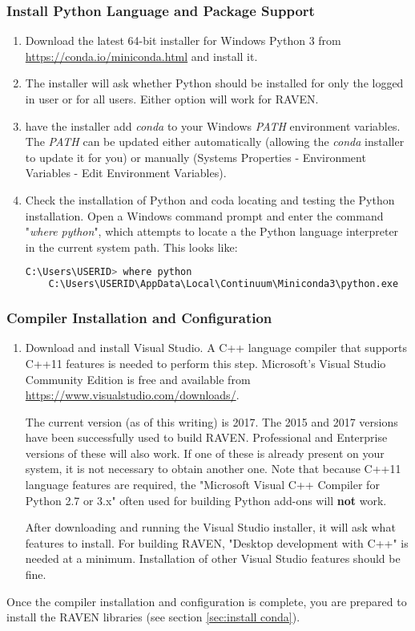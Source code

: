 \subsubsection{Install Python Language and Package Support}
\begin{enumerate} 
	\item Download the latest 64-bit installer for Windows Python 3 from
		\url{https://conda.io/miniconda.html} and install it.  \item The installer
		will ask whether Python should be installed for only the logged in user or
		for all users.  Either option will work for RAVEN.
	\item 	have  the installer add \textit{conda} to your Windows \textit{PATH} environment variables.   
	The \textit{PATH} can be updated either automatically (allowing the  \textit{conda} installer to update it for you) 
	or manually (Systems Properties - Environment Variables - Edit Environment Variables).
	\item Check the installation of Python and coda locating and testing the Python installation.   
	Open a Windows command prompt and enter the
		command "{\it where python}", which attempts to locate a the Python language interpreter
		in the current system path.  This looks like:

    \begin{lstlisting}[language=bash, basicstyle=\small]
    C:\Users\USERID> where python
    C:\Users\USERID\AppData\Local\Continuum\Miniconda3\python.exe
    \end{lstlisting}

\end{enumerate}


\subsubsection{Compiler Installation and Configuration}
\begin{enumerate}
	\item Download and install Visual Studio.  A C++ language compiler that supports C++11 features
		is needed to perform this step. Microsoft's Visual Studio Community Edition is free and
		available from \url{https://www.visualstudio.com/downloads/}.

		The current version (as of this writing) is 2017. The 2015 and 2017 versions have been
		successfully used to build RAVEN. Professional and Enterprise versions of these will
		also work. If one of these is already present on your system, it is not necessary to
		obtain another one. Note that because C++11 language features are required, the
		"Microsoft Visual C++ Compiler for Python 2.7 or 3.x" often used for building Python
		add-ons will {\bf not} work.

		After downloading and running the Visual Studio installer, it will ask what features
		to install. For building RAVEN, "Desktop development with C++" is needed at a minimum.
		Installation of other Visual Studio features should be fine.
\end{enumerate}

Once the compiler installation and configuration is complete, you are prepared to install the RAVEN libraries
(see section \ref{sec:install conda}).


